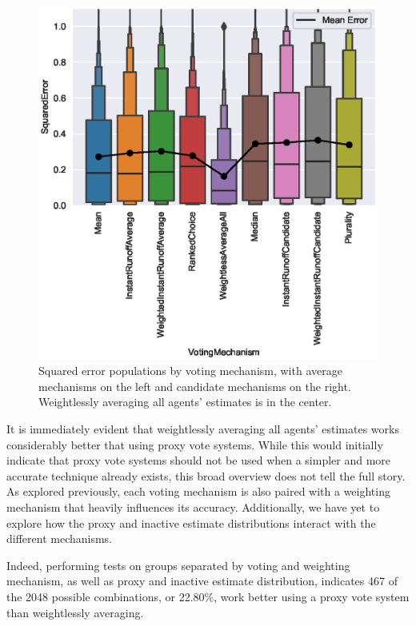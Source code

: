 \begin{figure}[htbp]
    \centering
    \includegraphics[scale=0.75]
    {./content/figures/weightless/weightless_voting_mechanisms_comparison}
    \caption{Squared error populations by voting mechanism, with average
    mechanisms on the left and candidate mechanisms on the right.
    Weightlessly averaging all agents' estimates is in the center.}
    \label{fig:weightless-voting-mechanisms-comparison}
\end{figure}

It is immediately evident that weightlessly averaging all agents' estimates works
considerably better that using proxy vote systems.
While this would initially indicate that proxy vote systems should not be used when a
simpler and more accurate technique already exists, this broad overview does not tell
the full story.
As explored previously, each voting mechanism is also paired with a weighting
mechanism that heavily influences its accuracy.
Additionally, we have yet to explore how the proxy and inactive estimate
distributions interact with the different mechanisms.

Indeed, performing tests on groups separated by voting and weighting mechanism, as
well as proxy and inactive estimate distribution, indicates 467 of the 2048 possible
combinations, or 22.80\%, work better using a proxy vote system than weightlessly
averaging.  

